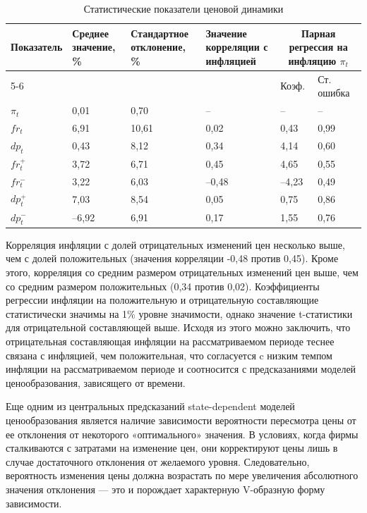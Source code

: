 \begin{table}[h]
	\centering
	\small  %
	\caption{Статистические показатели ценовой динамики}
	\label{tab:inflation_stats}
	\begin{tabularx}{\textwidth}{|X|X|X|X|X|X|}
		\hline
		Показатель & Среднее значение, \% & Стандартное отклонение, \% & Значение корреляции с инфляцией & \multicolumn{2}{c|}{Парная регрессия на инфляцию $\pi_t$} \\
		\cline{5-6}
		& & & & Коэф. & Ст. ошибка \\
		\hline
		$\pi_t$         & 0,01  & 0,70  & –     & –     & –    \\
		$fr_t$         & 6,91  & 10,61 & 0,02  & 0,43  & 0,99 \\
		$dp_t$         & 0,43  & 8,12  & 0,34  & 4,14  & 0,60 \\
		$fr_t^{+}$     & 3,72  & 6,71  & 0,45  & 4,65  & 0,55 \\
		$fr_t^{-}$     & 3,22  & 6,03  & –0,48 & –4,23 & 0,49 \\
		$dp_t^{+}$     & 7,03  & 8,54  & 0,05  & 0,75  & 0,86 \\
		$dp_t^{-}$     & –6,92 & 6,91  & 0,17  & 1,55  & 0,76 \\
		\hline
	\end{tabularx}
\end{table}

Корреляция инфляции с долей отрицательных изменений цен несколько выше, чем с долей положительных (значения корреляции -0,48 против 0,45). Кроме этого, корреляция со средним размером отрицательных изменений цен выше, чем со средним размером положительных (0,34 против 0,02). Коэффициенты регрессии инфляции на положительную и отрицательную составляющие статистически значимы на 1\% уровне значимости, однако значение t-статистики для отрицательной составляющей выше. Исходя из этого можно заключить, что отрицательная составляющая инфляции на рассматриваемом периоде теснее связана с инфляцией, чем положительная, что согласуется c низким темпом инфляции на рассматриваемом периоде и соотносится с предсказаниями моделей ценообразования, зависящего от времени.

Еще одним из центральных предсказаний state-dependent моделей ценообразования является наличие зависимости вероятности пересмотра цены от ее отклонения от некоторого «оптимального» значения. В условиях, когда фирмы сталкиваются с затратами на изменение цен, они корректируют цены лишь в случае достаточного отклонения от желаемого уровня. Следовательно, вероятность изменения цены должна возрастать по мере увеличения абсолютного значения отклонения — это и порождает характерную V-образную форму зависимости.

